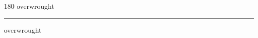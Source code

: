 
\begin{frame}
\begin{center}
\begin{turn}{180}
{\fontsize{2.5cm}{1em}\selectfont overwrought}
\end{turn}
\vspace{1em}\par  
\hrule
\vspace{1em}\par  
{\fontsize{2.5cm}{1em}\selectfont overwrought}
\end{center}
\end{frame}
